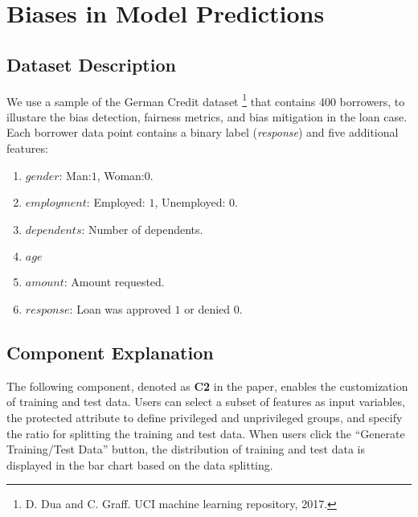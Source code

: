 \section{Biases in Model Predictions}

\subsection{Dataset Description}

\par We use a sample of the German Credit dataset \footnote{D. Dua and C. Graff. UCI machine learning repository, 2017.} that contains 400 borrowers, 
to illustare the bias detection, fairness metrics, and bias mitigation in the loan case. Each borrower data point contains a binary label (\emph{response}) 
and five additional features: 

\begin{enumerate}
    \item $gender$: Man:$1$, Woman:$0$.
    \item $employment$: Employed: $1$, Unemployed: $0$.
    \item $dependents$: Number of dependents.
    \item $age$ 
    \item $amount$: Amount requested.
    \item $response$: Loan was approved $1$ or denied $0$.
\end{enumerate}


\begin{visualComponent}
\end{visualComponent}


\subsection{Component Explanation}
The following component, denoted as \textbf{C2} in the paper, enables the customization of training and test data. Users can select a subset of features as input variables, the protected attribute to define privileged and unprivileged groups, and specify the ratio for splitting the training and test data. When users click the “Generate Training/Test Data” button, the distribution of training and test data is displayed in the bar chart based on the data splitting.

